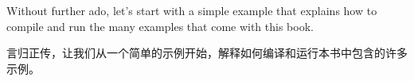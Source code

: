 Without further ado, let’s start with a simple example that explains how to compile and run the many examples that come with this book.

言归正传，让我们从一个简单的示例开始，解释如何编译和运行本书中包含的许多示例。














